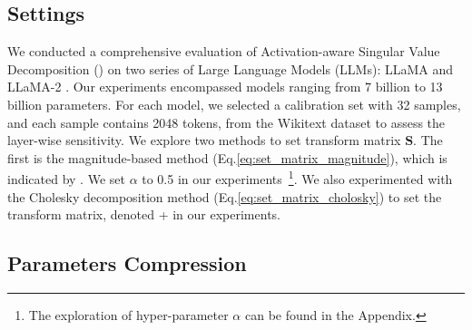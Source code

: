
\subsection{Settings}
We conducted a comprehensive evaluation of Activation-aware Singular Value Decomposition (\asvd) on two series of Large Language Models (LLMs): LLaMA and LLaMA-2 \citep{touvron2023llama1,touvron2023llama2}. Our experiments encompassed models ranging from 7 billion to 13 billion parameters. For each model, we selected a calibration set with 32 samples, and each sample contains 2048 tokens, from the Wikitext dataset to assess the layer-wise sensitivity. We explore two methods to set transform matrix $\mathbf{S}$. The first is the magnitude-based method (Eq.\ref{eq:set_matrix_magnitude}), which is indicated by \asvd. We set $\alpha$ to 0.5 in our experiments~\footnote{The exploration of hyper-parameter $\alpha$ can be found in the Appendix.}. We also experimented with the Cholesky decomposition method (Eq.\ref{eq:set_matrix_cholosky}) to set the transform matrix, denoted \asvd+ in our experiments.

\subsection{Parameters Compression}

